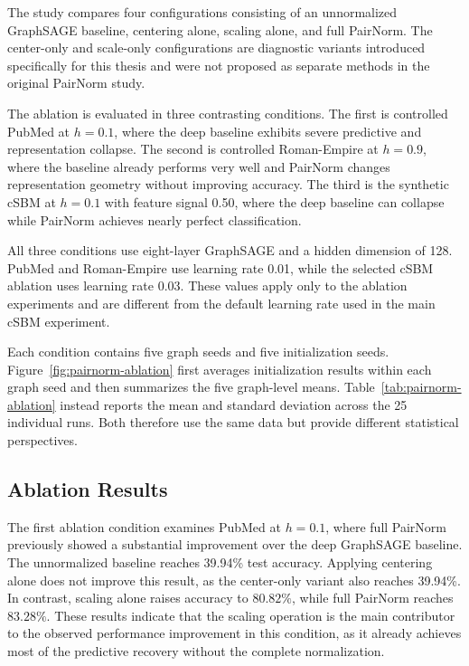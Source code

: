 \documentclass[english]{lni}
\begin{document}
The study compares four configurations consisting of an unnormalized GraphSAGE baseline, centering alone, scaling alone, and full PairNorm. The center-only and scale-only configurations are diagnostic variants introduced specifically for this thesis and were not proposed as separate methods in the original PairNorm study.

The ablation is evaluated in three contrasting conditions. The first is controlled PubMed at $h=0.1$, where the deep baseline exhibits severe predictive and representation collapse. The second is controlled Roman-Empire at $h=0.9$, where the baseline already performs very well and PairNorm changes representation geometry without improving accuracy. The third is the synthetic cSBM at $h=0.1$ with feature signal 0.50, where the deep baseline can collapse while PairNorm achieves nearly perfect classification.

All three conditions use eight-layer GraphSAGE and a hidden dimension of 128. PubMed and Roman-Empire use learning rate 0.01, while the selected cSBM ablation uses learning rate 0.03. These values apply only to the ablation experiments and are different from the default learning rate used in the main cSBM experiment.

Each condition contains five graph seeds and five initialization seeds. Figure~\ref{fig:pairnorm-ablation} first averages initialization results within each graph seed and then summarizes the five graph-level means. Table~\ref{tab:pairnorm-ablation} instead reports the mean and standard deviation across the 25 individual runs. Both therefore use the same data but provide different statistical perspectives.

\subsection{Ablation Results}
\label{sec:pairnorm-ablation-results}

The first ablation condition examines PubMed at $h=0.1$, where full PairNorm previously showed a substantial improvement over the deep GraphSAGE baseline. The unnormalized baseline reaches 39.94\% test accuracy. Applying centering alone does not improve this result, as the center-only variant also reaches 39.94\%. In contrast, scaling alone raises accuracy to $80.82\%$, while full PairNorm reaches $83.28\%$. These results indicate that the scaling operation is the main contributor to the observed performance improvement in this condition, as it already achieves most of the predictive recovery without the complete normalization.
\end{document}
